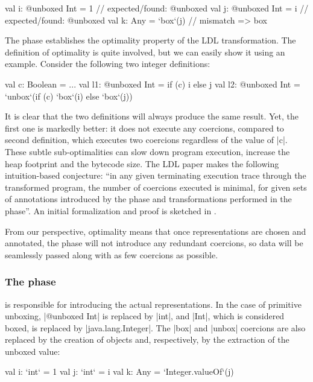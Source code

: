 \begin{lstlisting-nobreak}
val i: @unboxed Int = 1 // expected/found: @unboxed
val j: @unboxed Int = i // expected/found: @unboxed
val k: Any = `box`(j)             // mismatch => box
\end{lstlisting-nobreak}

The \coerce{} phase establishes the optimality property of the LDL transformation. The definition of optimality is quite involved, but we can easily show it using an example. Consider the following two integer definitions:

\begin{lstlisting-nobreak}
val c: Boolean = ...
val l1: @unboxed Int = if (c) i else j
val l2: @unboxed Int = `unbox`(if (c) `box`(i) else `box`(j))
\end{lstlisting-nobreak}

It is clear that the two definitions will always produce the same result. Yet, the first one is markedly better: it does not execute any coercions, compared to second definition, which executes two coercions regardless of the value of |c|. These subtle sub-optimalities can slow down program execution, increase the heap footprint and the bytecode size. The LDL paper \cite{ldl} makes the following intuition-based conjecture: ``in any given terminating execution trace through the transformed program, the number of coercions executed is minimal, for given sets of annotations introduced by the \inject{} phase and transformations performed in the \commit{} phase''. An initial formalization and proof is sketched in \cite{ldl-form}.

From our perspective, optimality means that once representations are chosen and annotated, the \coerce{} phase will not introduce any redundant coercions, so data will be seamlessly passed along with as few coercions as possible.

\vspace{-0.3em}
\subsubsection{The \commit{} phase} is responsible for introducing the actual representations. In the case of primitive unboxing, |@unboxed Int| is replaced by |int|, and |Int|, which is considered boxed, is replaced by |java.lang.Integer|. The |box| and |unbox| coercions are also replaced by the creation of objects and, respectively, by the extraction of the unboxed value:

\vspace{-0.4em}
\begin{lstlisting-nobreak}
val i: `int` = 1
val j: `int` = i
val k: Any = `Integer.valueOf`(j)
\end{lstlisting-nobreak}

